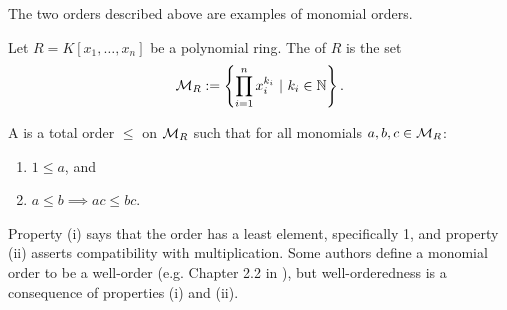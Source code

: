 The two orders described above are examples of monomial orders.
\begin{definition}
  \label{def_monomial_order}
  Let $R = K[x_1, \ldots, x_n]$ be a polynomial ring.
  The  of $R$ is the set
  \begin{equation*}
    \cal M_R := \left\{ \prod_{i=1}^n x_i^{k_i} ~|~ k_i \in \bb N \right\}.
  \end{equation*}
  
  A  is a total order $\leq$ on $\cal M_R$ such that for all monomials $a, b, c \in \cal M_R$:
  \begin{enumerate}[label=(\roman*)]
    \item $1 \leq a$, and
    \item $a \leq b \implies ac \leq bc$.
  \end{enumerate}
\end{definition}
Property (i) says that the order has a least element, specifically 1, and property (ii) asserts compatibility with multiplication.
Some authors define a monomial order to be a well-order (e.g. Chapter 2.2 in \cite{cox07}),
but well-orderedness is a consequence of properties (i) and (ii).
